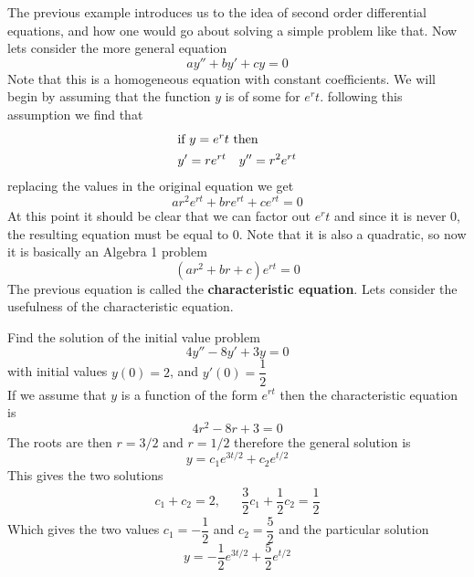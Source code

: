 	The previous example introduces us to the idea of second order differential equations, and how one would go about solving a simple problem like that. Now lets consider the more general equation 
	\[ ay'' + by' + cy = 0 \]
	Note that this is a homogeneous equation with constant coefficients. We will begin by assuming that the function $ y $ is of some for $ e^rt $. following this assumption we find that 
	\begin{align*}
		\intertext{if $ y = e^rt $ then}
		y' = re^{rt} && y'' = r^2e^{rt}
	\end{align*}
	replacing the values in the original equation we get
	\[ 	ar^2e^{rt} + bre^{rt} + ce^{rt} = 0 \]
	At this point it should be clear that we can factor out $ e^rt $ and since it is never 0, the resulting equation must be equal to 0. Note that it is also a quadratic, so now it is basically an Algebra 1 problem
	\[ (ar^2 + br + c)e^{rt} = 0 \]
	The previous equation is called the \textbf{characteristic equation}. Lets consider the usefulness of the characteristic equation. 
	\begin{example}
		Find the solution of the initial value problem
		\[ 4 y'' - 8y' + 3y = 0 \]
		with initial values $ y(0) = 2 $, and $ y'(0) = \dfrac{1}{2} $\\
		If we assume that $ y $ is a function of the form $ e^{rt} $ then the characteristic equation is 
		\[ 4r^2 - 8r+3 = 0 \]
		The roots are then $ r = 3/2 $ and $r = 1/2$ therefore the general solution is
		\[ y = c_1 e^{3t/2} + c_2 e^{t/2} \]
		This gives the two solutions 
		\begin{align*}
			c_1 + c_2 = 2, && \dfrac{3}{2} c_1 + \dfrac{1}{2}c_2 = \dfrac{1}{2}
		\end{align*}
		Which gives the two values $ c_1 = -\dfrac{1}{2} $ and $ c_2 = \dfrac{5}{2} $ and the particular solution
		\[ y =  -\dfrac{1}{2}e^{3t/2} + \dfrac{5}{2}e^{t/2}\]
	\end{example}
